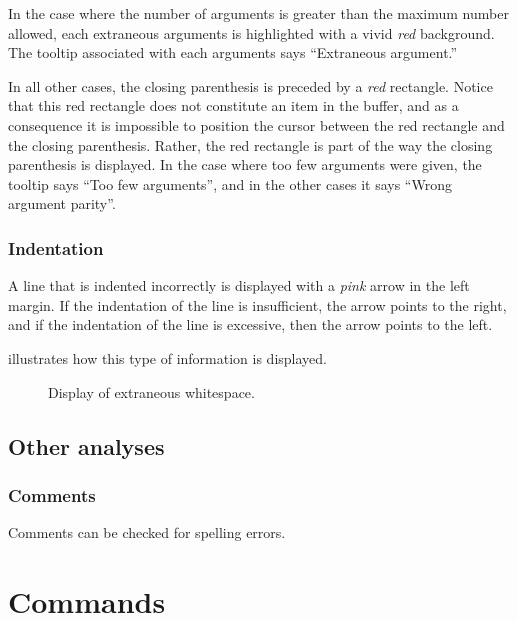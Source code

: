 In the case where the number of arguments is greater than the maximum
number allowed, each extraneous arguments is highlighted with a vivid
\emph{red} background.  The tooltip associated with each arguments
says ``Extraneous argument.'' 

In all other cases, the closing parenthesis is preceded by a
\emph{red} rectangle.  Notice that this red rectangle does not
constitute an item in the buffer, and as a consequence it is
impossible to position the cursor between the red rectangle and the
closing parenthesis.  Rather, the red rectangle is part of the way the
closing parenthesis is displayed.  In the case where too few arguments
were given, the tooltip says ``Too few arguments'', and in the other
cases it says ``Wrong argument parity''.

\subsubsection{Indentation}

A line that is indented incorrectly is displayed with a \emph{pink}
arrow in the left margin.  If the indentation of the line is
insufficient, the arrow points to the right, and if the indentation of
the line is excessive, then the arrow points to the left.

 illustrates how this type of
information is displayed.

\begin{figure}
\begin{center}
\end{center}
\caption{\label{fig-wrong-indentation}
Display of extraneous whitespace.}
\end{figure}

\subsection{Other analyses}

\subsubsection{Comments}

Comments can be checked for spelling errors. 

\section{Commands}

